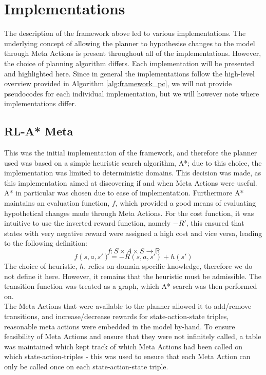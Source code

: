 \section{Implementations}
The description of the framework above led to various implementations. The underlying concept of allowing the planner to hypothesise changes to the model through Meta Actions is present throughout all of the implementations. However, the choice of planning algorithm differs. Each implementation will be presented and highlighted here. Since in general the implementations follow the high-level overview provided in Algorithm \ref{alg:framework_pc}, we will not provide pseudocodes for each individual implementation, but we will however note where implementations differ.
\subsection{RL-A* Meta}
This was the initial implementation of the framework, and therefore the planner used was based on a simple heuristic search algorithm, A*; due to this choice, the implementation was limited to deterministic domains. This decision was made, as this implementation aimed at discovering if and when Meta Actions were useful. A* in particular was chosen due to ease of implementation. Furthermore A* maintains an evaluation function, $f$, which provided a good means of evaluating hypothetical changes made through Meta Actions.
For the cost function,  it was intuitive to use the inverted reward function, namely $-R'$, this ensured that states with very negative reward were assigned a high cost and vice versa, leading to the following definition:
\begin{equation}
\label{eqn:astareval}
f : S \times A \times S \rightarrow \mathbb{R}
\end{equation}
\begin{equation}
\label{eqn:astarevalsas}
f(s,a,s') = -R(s, a, s') + h(s')
\end{equation}
The choice of heuristic, $h$, relies on domain specific knowledge, therefore we do not define it here. However,  it remains that the heuristic must be admissible. The transition function was treated as a graph, which A* search was then performed on.
\\The Meta Actions that were available to the planner allowed it to add/remove transitions, and increase/decrease rewards for state-action-state triples, reasonable meta actions were embedded in the model by-hand. To ensure feasibility of Meta Actions and ensure that they were not infinitely called, a table was maintained which kept track of which Meta Actions had been called on which state-action-triples - this was used to ensure that each Meta Action can only be called once on each state-action-state triple. 
